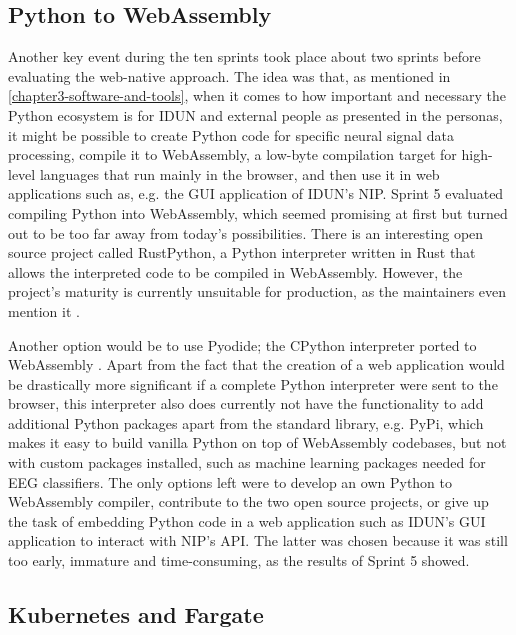 \subsection{Python to WebAssembly}
\label{chapter4-python-to-webassembly}

Another key event during the ten sprints took place about two sprints before evaluating the web-native approach. The idea was that, as mentioned in \autoref{chapter3-software-and-tools}, when it comes to how important and necessary the Python ecosystem is for IDUN and external people as presented in the personas, it might be possible to create Python code for specific neural signal data processing, compile it to WebAssembly, a low-byte compilation target for high-level languages that run mainly in the browser, and then use it in web applications such as, e.g. the GUI application of IDUN's NIP. Sprint 5 evaluated compiling Python into WebAssembly, which seemed promising at first but turned out to be too far away from today's possibilities. There is an interesting open source project called RustPython, a Python interpreter written in Rust that allows the interpreted code to be compiled in WebAssembly. However, the project's maturity is currently unsuitable for production, as the maintainers even mention it \citep{noauthor_rustpython_2022}.

Another option would be to use Pyodide; the CPython interpreter ported to WebAssembly \citep{noauthor_pyodide_2022}. Apart from the fact that the creation of a web application would be drastically more significant if a complete Python interpreter were sent to the browser, this interpreter also does currently not have the functionality to add additional Python packages apart from the standard library, e.g. PyPi, which makes it easy to build vanilla Python on top of WebAssembly codebases, but not with custom packages installed, such as machine learning packages needed for EEG classifiers. The only options left were to develop an own Python to WebAssembly compiler, contribute to the two open source projects, or give up the task of embedding Python code in a web application such as IDUN's GUI application to interact with NIP's API. The latter was chosen because it was still too early, immature and time-consuming, as the results of Sprint 5 showed.

\subsection{Kubernetes and Fargate}
\label{chapter4-kubernetes-and-aws-fargate}

